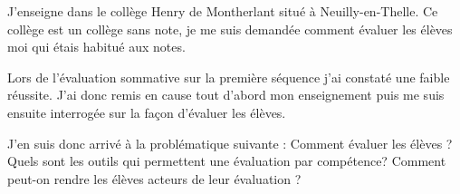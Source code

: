 
J'enseigne dans le collège Henry de Montherlant situé à Neuilly-en-Thelle.
Ce collège est un collège sans note, je me suis demandée comment évaluer les élèves moi qui étais habitué aux notes.

Lors de l'évaluation sommative sur la première séquence j'ai constaté une faible réussite.
J'ai donc remis en cause tout d'abord mon enseignement puis me suis ensuite interrogée sur la façon d'évaluer les élèves.

J'en suis donc arrivé à la problématique suivante : 
Comment évaluer les élèves ?
Quels sont les outils qui permettent une évaluation par compétence?
Comment peut-on rendre les élèves acteurs de leur évaluation ?

